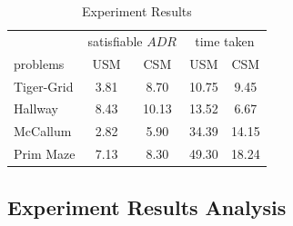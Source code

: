 \documentclass{article}
\begin{document}
\begin{table}[h]
	\caption{Experiment Results}
	\label{table:results}
	\centering
	\begin{tabular}{lcccc}
		\toprule
                  &\multicolumn{2}{c}{satisfiable $ADR$}      &\multicolumn{2}{c}{time taken} \\ 
                  \cmidrule(r){2-3}                 \cmidrule(r){4-5}
    problems      & USM         & CSM               &USM           & CSM      \\
    \midrule
		Tiger-Grid    & 3.81        & 8.70              & 10.75        & 9.45     \\ 
		Hallway       & 8.43        & 10.13             & 13.52        & 6.67     \\ 
		McCallum      & 2.82        & 5.90              & 34.39        & 14.15    \\ 
    Prim Maze     & 7.13        & 8.30              & 49.30        & 18.24    \\ 
    \bottomrule
	\end{tabular}
\end{table}

\subsection{Experiment Results Analysis}





\end{document}

